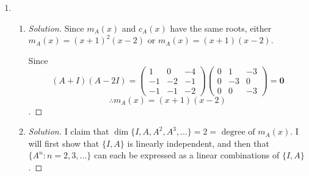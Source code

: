 \documentclass[12pt, a4paper]{article}
\newcommand{\pmat}[1]{ \begin{pmatrix}#1\end{pmatrix} }
\DeclareMathOperator{\spn}{span}
\begin{document}
\begin{enumerate}
\begin{enumerate}
\begin{proof}[Solution]
          For eigenvalue 1,

          \begin{align*}
            E_1 &= \ker(A-I)\\
            &=\ker\pmat{0&0&1\\0&0&0\\1&2&0}\\
            &=\spn\big\{\pmat{2\\-1\\0}\big\}
            .\end{align*}

          And eigenvalue 2,

          \begin{align*}
            E_2 &= \ker(A-2I)\\
            &=\ker\pmat{-1&0&1\\0&-1&0\\1&2&-1}\\
            &=\ker\pmat{-1&0&1\\0&-1&0\\0&0&0}\\
            &=\spn\big\{\pmat{1\\0\\1}\big\}
            .\end{align*}

          Therefore, $\mathcal{B}=\{1-x^2,2-x,1+x^2\}$, and $[T]_\mathcal{B}=$
          \[ \pmat{0&0&0\\0&1&0\\0&0&2} \]
          .\end{proof}
    \end{enumerate}

  \item
    \begin{enumerate} %
      \item
        \begin{proof}[Solution]
          Since $m_A(x)$ and $c_A(x)$ have the same roots, either
          $m_A(x)=(x+1)^2(x-2)$ or $m_A(x)=(x+1)(x-2)$.

          Since
          \[ (A+I)(A-2I)=\pmat{1&0&-4\\-1&-2&-1\\-1&-1&-2}
            \pmat{0&1&-3\\0&-3&0\\0&0&-3}=\mathbf{0}\]
          \[ \therefore m_A(x)=(x+1)(x-2) \].
        \end{proof}

      \item
        \begin{proof}[Solution]
          I claim that $\dim\{I,A,A^2,A^3,\dots\}=2=\text{ degree of }m_A(x)$. I
          will first show that $\{I,A\}$ is linearly independent, and then that
          $\{A^n:n=2,3,\dots\}$ can each be expressed as a linear combinations of
          $\{I,A\}$.


\end{proof}
\end{enumerate}
\end{enumerate}
\end{document}
